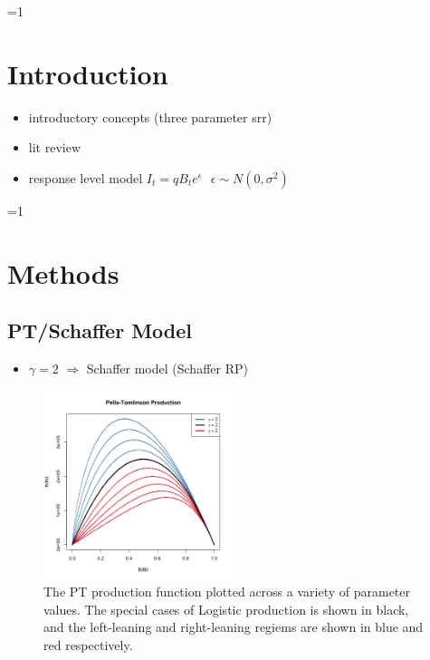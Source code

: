 \documentclass[12pt]{article}
\newcounter{alphasect}
\def\alphainsection{0}
\let\oldsection=\section
\def\section{%
  \ifnum\alphainsection=1%
    \addtocounter{alphasect}{1}
  \fi%
\oldsection}%
\begin{document}
%
\clearpage

%
\section{Introduction\label{int}}
\begin{itemize}
	\item introductory concepts (three parameter srr)
	\item lit review
	\item response level model $I_t = q B_t e^\epsilon ~~~ \epsilon\sim N(0, \sigma^2)$
\end{itemize}

%
\clearpage
\section{Methods \label{meth}}

%
\subsection{PT/Schaffer Model}
	\begin{itemize}
		\item $\gamma=2$ $\Rightarrow$ Schaffer model (Schaffer RP)
	\end{itemize}

%
\begin{figure}
\vspace{-2cm}
\includegraphics[width=0.49\textwidth]{../ptNew/g4PT.png}
\vspace{-1cm}
\caption{
The PT production function plotted across a variety of parameter
values. The special cases of Logistic production is shown in black, and the 
left-leaning and right-leaning regiems are shown in blue and red respectively.
}
\label{srrPT}
\end{figure}
\end{document}
